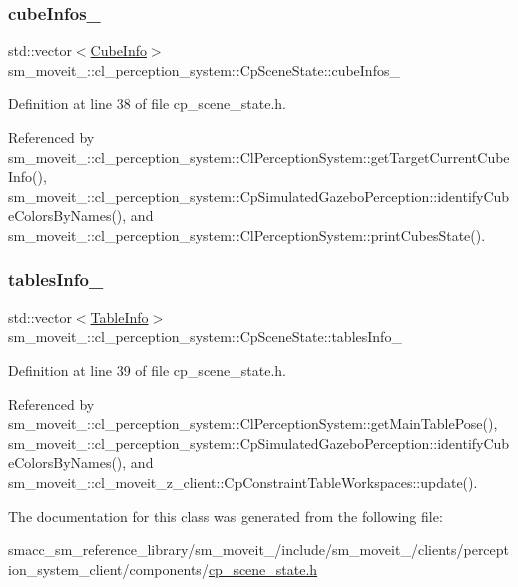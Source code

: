 \subsubsection{\texorpdfstring{cube\+Infos\+\_\+}{cubeInfos\_}}
{\footnotesize\ttfamily std\+::vector$<$\hyperlink{structsm__moveit__4_1_1cl__perception__system_1_1CubeInfo}{Cube\+Info}$>$ sm\+\_\+moveit\+\_\+::cl\+\_\+perception\+\_\+system\+::\+Cp\+Scene\+State\+::cube\+Infos\+\_\+}



Definition at line 38 of file cp\+\_\+scene\+\_\+state.\+h.



Referenced by sm\+\_\+moveit\+\_\+::cl\+\_\+perception\+\_\+system\+::\+Cl\+Perception\+System\+::get\+Target\+Current\+Cube\+Info(), sm\+\_\+moveit\+\_\+::cl\+\_\+perception\+\_\+system\+::\+Cp\+Simulated\+Gazebo\+Perception\+::identify\+Cube\+Colors\+By\+Names(), and sm\+\_\+moveit\+\_\+::cl\+\_\+perception\+\_\+system\+::\+Cl\+Perception\+System\+::print\+Cubes\+State().

\mbox{\label{classsm__moveit__4_1_1cl__perception__system_1_1CpSceneState_a95f74dd16566d97e017650ccdf4b8a46}} 
\subsubsection{\texorpdfstring{tables\+Info\+\_\+}{tablesInfo\_}}
{\footnotesize\ttfamily std\+::vector$<$\hyperlink{structsm__moveit__4_1_1cl__perception__system_1_1TableInfo}{Table\+Info}$>$ sm\+\_\+moveit\+\_\+::cl\+\_\+perception\+\_\+system\+::\+Cp\+Scene\+State\+::tables\+Info\+\_\+}



Definition at line 39 of file cp\+\_\+scene\+\_\+state.\+h.



Referenced by sm\+\_\+moveit\+\_\+::cl\+\_\+perception\+\_\+system\+::\+Cl\+Perception\+System\+::get\+Main\+Table\+Pose(), sm\+\_\+moveit\+\_\+::cl\+\_\+perception\+\_\+system\+::\+Cp\+Simulated\+Gazebo\+Perception\+::identify\+Cube\+Colors\+By\+Names(), and sm\+\_\+moveit\+\_\+::cl\+\_\+moveit\+\_\+z\+\_\+client\+::\+Cp\+Constraint\+Table\+Workspaces\+::update().



The documentation for this class was generated from the following file\+:\begin{DoxyCompactItemize}
\item 
smacc\+\_\+sm\+\_\+reference\+\_\+library/sm\+\_\+moveit\+\_/include/sm\+\_\+moveit\+\_/clients/perception\+\_\+system\+\_\+client/components/\hyperlink{cp__scene__state_8h}{cp\+\_\+scene\+\_\+state.\+h}\end{DoxyCompactItemize}

